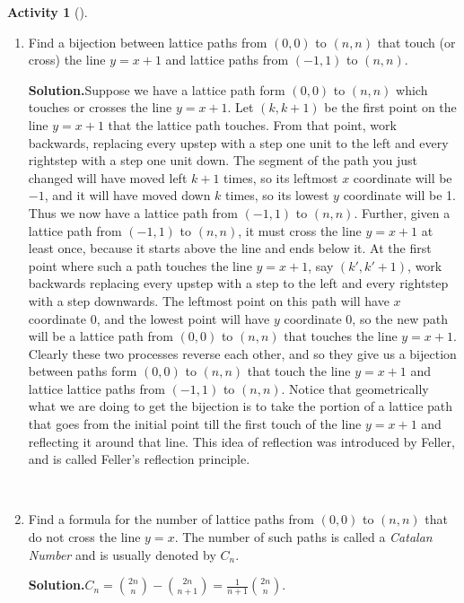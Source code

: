 \documentclass[10pt,]{book}
\theoremstyle{plain}
\theoremstyle{definition}
\newtheorem{activity}[project]{Activity}
\numberwithin{equation}{chapter}
\begin{document}
\begin{activity}[]
\begin{enumerate}[label=(\alph*)]
~\par
\item Find a bijection between lattice paths from \((0,0)\) to \((n,n)\) that touch (or cross) the line \(y=x+1\) and lattice paths from \((-1,1)\) to \((n,n)\).%
\par\medskip\noindent%
\textbf{Solution.}\quad Suppose we have a lattice path form \((0,0)\) to \((n,n)\) which touches or crosses the line \(y=x+1\). Let \((k,k+1)\) be the first point on the line \(y=x+1\) that the lattice path touches. From that point, work backwards, replacing every upstep with a step one unit to the left and every rightstep with a step one unit down. The segment of the path you just changed will have moved left \(k+1\) times, so its leftmost \(x\) coordinate will be \(-1\), and it will have moved down \(k\) times, so its lowest \(y\) coordinate will be 1.  Thus we now have a lattice path from \((-1,1)\) to \((n,n)\). Further, given a lattice path from \((-1,1)\) to \((n,n)\), it must cross the line \(y=x+1\) at least once, because it starts above the line and ends below it. At the first point where such a path touches the line \(y=x+1\), say \((k',k'+1)\), work backwards replacing every upstep with a step to the left and every rightstep with a step downwards. The leftmost point on this path will have \(x\) coordinate 0, and the lowest point will have \(y\) coordinate 0, so the new path will be a lattice path from \((0,0)\) to \((n,n)\) that touches the line \(y=x+1\). Clearly these two processes reverse each other, and so they give us a bijection between paths form \((0,0)\) to \((n,n)\) that touch the line \(y=x+1\) and lattice lattice paths from \((-1,1)\) to \((n,n)\). Notice that geometrically what we are doing to get the bijection is to take the portion of a lattice path that goes from the initial point till the first touch of the line \(y=x+1\) and reflecting it around that line. This idea of reflection was introduced by Feller, and is called Feller's reflection principle.%

~\par
\item Find a formula for the number of lattice paths from \((0,0)\) to \((n,n)\) that do not cross the line \(y=x\).  The number of such paths is called a \emph{Catalan Number} and is usually denoted by \(C_n\).%
\par\medskip\noindent%
\textbf{Solution.}\quad \(C_n=\binom{2n}{n} - \binom{2n }{n+1}=\frac{1}{n+1}\binom{2n}{n}.\)%

\end{enumerate}
\end{activity}
\end{document}
